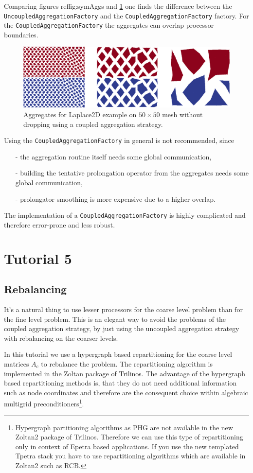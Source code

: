 \documentclass[12pt,a4paper]{article}
\begin{document}
Comparing figures ref{fig:symAggs} and \ref{fig:nonsymAggsCoupled} one finds the difference between the \verb|UncoupledAggregationFactory| and the \verb|CoupledAggregationFactory| factory. For the \verb|CoupledAggregationFactory| the aggregates can overlap processor boundaries.
\begin{figure}
\includegraphics[width=\textwidth]{images/aggsSymmCoupled.png} 
\caption{Aggregates for Laplace2D example on $50\times 50$ mesh without dropping using a coupled aggregation strategy.}
\label{fig:nonsymAggsCoupled}
\end{figure}

Using the \verb|CoupledAggregationFactory| in general is not recommended, since
\begin{itemize}
\item[-] the aggregation routine itself needs some global communication,
\item[-] building the tentative prolongation operator from the aggregates needs some global communication,
\item[-] prolongator smoothing is more expensive due to a higher overlap.
\end{itemize}
The implementation of a \verb|CoupledAggregationFactory| is highly complicated and therefore error-prone and less robust.

\section{Tutorial 5}
\subsection{Rebalancing}
It's a natural thing to use lesser processors for the coarse level problem than for the fine level problem. This is an elegant way to avoid the problems of the coupled aggregation strategy, by just using the uncoupled aggregation strategy with rebalancing on the coarser levels.

In this tutorial we use a hypergraph based repartitioning for the coarse level matrices $A_c$ to rebalance the problem. The repartitioning algorithm is implemented in the Zoltan package of Trilinos. The advantage of the hypergraph based repartitioning methods is, that they do not need additional information such as node coordinates and therefore are the consequent choice within algebraic multigrid preconditioners\footnote{Hypergraph partitioning algorithms as PHG are not available in the new Zoltan2 package of Trilinos. Therefore we can use this type of repartitioning only in context of Epetra based applications. If you use the new templated Tpetra stack you have to use repartitioning algorithms which are available in Zoltan2 such as RCB.}.
\end{document}
